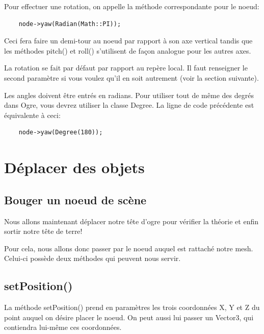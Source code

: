 Pour effectuer une rotation, on appelle la m\'ethode correspondante pour le noeud:
\begin{lstlisting}
	node->yaw(Radian(Math::PI));
\end{lstlisting}

Ceci fera faire un demi-tour au noeud par rapport \`{a} son axe vertical tandis que les m\'ethodes pitch() et roll() s'utilisent de fa\c{c}on analogue pour les autres axes.

La rotation se fait par d\'efaut par rapport au rep\`ere local. Il faut renseigner le second param\`etre si vous voulez qu'il en soit autrement (voir la section suivante).

Les angles doivent \^etre entr\'es en radians. Pour utiliser tout de m\^eme des degr\'es dans Ogre, vous devrez utiliser la classe Degree. La ligne de code pr\'ec\'edente est \'equivalente \`{a} ceci:
\begin{lstlisting}
	node->yaw(Degree(180));
\end{lstlisting}









\section{D\'eplacer des objets}




\subsection{Bouger un noeud de sc\`ene}

Nous allons maintenant d\'eplacer notre t\^ete d'ogre pour v\'erifier la th\'eorie et enfin sortir notre t\^ete de terre!

Pour cela, nous allons donc passer par le noeud auquel est rattach\'e notre mesh. Celui-ci poss\`ede deux m\'ethodes qui peuvent nous servir.




\subsection{setPosition()}

La m\'ethode setPosition() prend en param\`etres les trois coordonn\'ees X, Y et Z du point auquel on d\'esire placer le noeud. On peut aussi lui passer un Vector3, qui contiendra lui-m\^eme ces coordonn\'ees.

